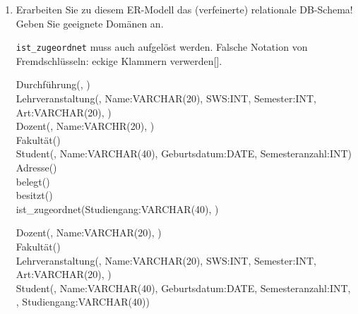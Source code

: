 \documentclass{lehramt-informatik-aufgabe}
\begin{document}
\renewcommand{\labelenumi}{(\alph{enumi})}
\begin{enumerate}
\item Erarbeiten Sie zu diesem ER-Modell das (verfeinerte) relationale
DB-Schema! Geben Sie geeignete
Domänen an.

\begin{antwort}[falsch]
\texttt{ist\_zugeordnet} muss auch aufgelöst
werden. Falsche Notation von Fremdschlüsseln: eckige Klammern
verwerden[].

\ttfamily
\footnotesize
Durchführung(, )\\

Lehrveranstaltung(, Name:VARCHAR(20), SWS:INT,
Semester:INT, Art:VARCHAR(20), )\\

Dozent(, Name:VARCHR(20),
)\\

Fakultät()\\

Student(, Name:VARCHAR(40), Geburtsdatum:DATE,
Semesteranzahl:INT)\\

Adresse()\\

belegt()\\

besitzt()\\

ist\_zugeordnet(Studiengang:VARCHAR(40), )\\
\end{antwort}

\begin{antwort}[muster]
\ttfamily
\footnotesize
Dozent(, Name:VARCHAR(20),
)\\

Fakultät()\\

Lehrveranstaltung(, Name:VARCHAR(20), SWS:INT,
Semester:INT, Art:VARCHAR(20), )\\

Student(, Name:VARCHAR(40), Geburtsdatum:DATE,
Semesteranzahl:INT, ,
Studiengang:VARCHAR(40))\\


\end{antwort}
\end{enumerate}
\end{document}
